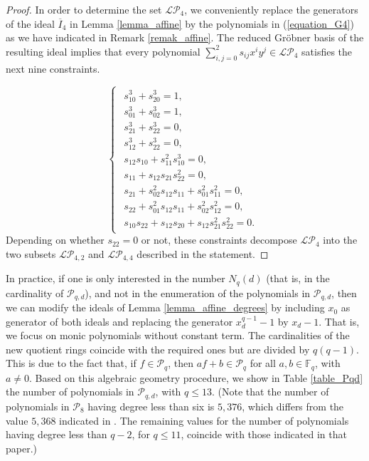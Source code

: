 \documentclass[pdflatex,sn-mathphys-num]{sn-jnl}
\theoremstyle{thmstyleone}%
\begin{document}
\begin{proof} In order to determine the set $\mathcal{LP}_4$, we conveniently replace the generators of the ideal $\overline{I}_4$ in Lemma \ref{lemma_affine} by the polynomials in (\ref{equation_G4}) as we have indicated in Remark \ref{remak_affine}. The reduced Gr\"obner basis of the resulting ideal implies that every polynomial $\sum_{i,j=0}^2 s_{ij}x^iy^j\in \mathcal{LP}_4$ satisfies the next nine constraints.

\[\begin{cases}
\begin{array}{r}
s_{10}^3+s_{20}^3=1,\\
s_{01}^3+s_{02}^3=1,\\
s_{21}^3+s_{22}^3=0,\\
s_{12}^3+s_{22}^3=0,\\
s_{12}s_{10}+s_{11}^2s_{10}^3=0,\\
s_{11}+s_{12}s_{21}s_{22}^2=0,\\
s_{21}+s_{02}^2s_{12}s_{11}+s_{01}^2s_{11}^2=0,\\
s_{22}+s_{01}^2s_{12}s_{11}+s_{02}^2s_{12}^2=0,\\
s_{10}s_{22}+s_{12}s_{20}+s_{12}s_{21}^2s_{22}^2=0.
\end{array}
\end{cases}\]
Depending on whether $s_{22}
=0$ or not, these constraints decompose $\mathcal{LP}_4$ into the two subsets $\mathcal{LP}_{4,2}$ and $\mathcal{LP}_{4,4}$ described in the statement.
\end{proof}

\vspace{0.2cm}

In practice, if one is only interested in the number $N_q(d)$ (that is, in the cardinality of $\mathcal{P}_{q,d}$), and not in the enumeration of the polynomials in $\mathcal{P}_{q,d}$, then we can modify the ideals of Lemma \ref{lemma_affine_degrees} by including $x_0$ as generator of both ideals and replacing the generator $x_d^{q-1}-1$ by $x_d-1$. That is, we focus on monic polynomials without constant term. The cardinalities of the new quotient rings coincide with the required ones but are divided by $q(q-1)$. This is due to the fact that, if $f\in\mathcal{P}_q$, then $af+b\in \mathcal{P}_q$ for all $a,b\in\mathbb{F}_q$, with $a\neq 0$. Based on this algebraic geometry procedure, we show in Table \ref{table_Pqd} the number of polynomials in $\mathcal{P}_{q,d}$, with $q\leq 13$. (Note that the number of polynomials in $\mathcal{P}_8$ having degree less than six is $5,376$, which differs from the value $5,368$ indicated in \cite{Konyagin2002}. The remaining values for the number of polynomials having degree less than $q-2$, for $q\leq 11$, coincide with those indicated in that paper.) 
\end{document}
